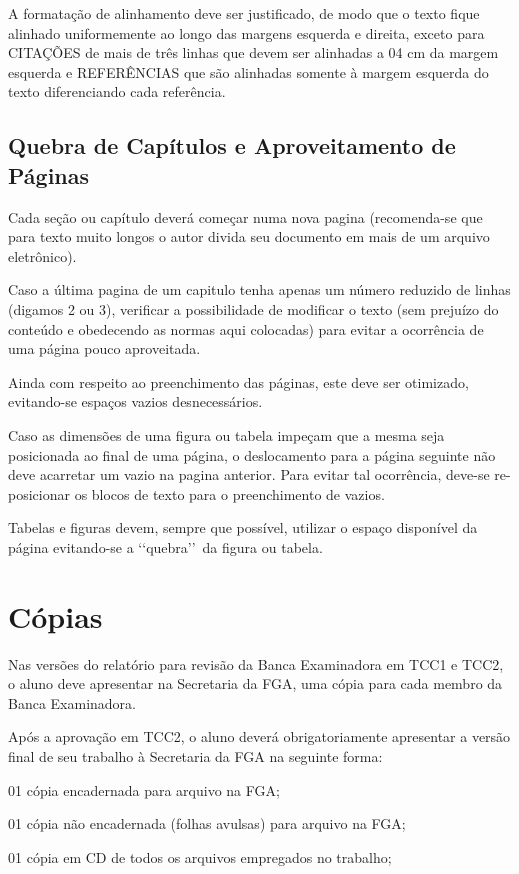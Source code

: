 A formatação de alinhamento deve ser justificado, de modo que o texto fique 
alinhado uniformemente ao longo das margens esquerda e direita, exceto para 
CITAÇÕES de mais de três linhas que devem ser alinhadas a 04 cm da margem 
esquerda e REFERÊNCIAS que são alinhadas somente à margem esquerda do texto 
diferenciando cada referência.

\subsection{Quebra de Capítulos e Aproveitamento de Páginas}

Cada seção ou capítulo deverá começar numa nova pagina (recomenda-se que 
para texto muito longos o autor divida seu documento em mais de um arquivo 
eletrônico). 

Caso a última pagina de um capitulo tenha apenas um número reduzido de 
linhas (digamos 2 ou 3), verificar a possibilidade de modificar o texto 
(sem prejuízo do conteúdo e obedecendo as normas aqui colocadas) para 
evitar a ocorrência de uma página pouco aproveitada.

Ainda com respeito ao preenchimento das páginas, este deve ser otimizado, 
evitando-se espaços vazios desnecessários. 

Caso as dimensões de uma figura ou tabela impeçam que a mesma seja 
posicionada ao final de uma página, o deslocamento para a página seguinte 
não deve acarretar um vazio na pagina anterior. Para evitar tal ocorrência, 
deve-se re-posicionar os blocos de texto para o preenchimento de vazios. 

Tabelas e figuras devem, sempre que possível, utilizar o espaço disponível 
da página evitando-se a \lq\lq quebra\rq\rq\ da figura ou tabela. 

\section{Cópias}

Nas versões do relatório para revisão da Banca Examinadora em TCC1 e TCC2, 
o aluno deve apresentar na Secretaria da FGA, uma cópia para cada membro da 
Banca Examinadora.

Após a aprovação em TCC2, o aluno deverá obrigatoriamente apresentar a 
versão final de seu trabalho à Secretaria da FGA na seguinte forma:

\begin{description}
	\item 01 cópia encadernada para arquivo na FGA;
	\item 01 cópia não encadernada (folhas avulsas) para arquivo na FGA;
	\item 01 cópia em CD de todos os arquivos empregados no trabalho;
\end{description}

